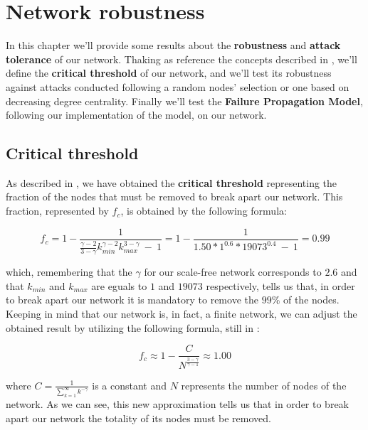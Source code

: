 \chapter{Network robustness} %
\label{cha:network_robustness}
    In this chapter we'll provide some results about the \textbf{robustness} and \textbf{attack tolerance} of our
    network. Thaking as reference the concepts described in \cite{network_science}, we'll define the
    \textbf{critical threshold} of our network, and we'll test its robustness against attacks conducted following
    a random nodes' selection or one based on decreasing degree centrality. Finally we'll test the
    \textbf{Failure Propagation Model}, following our implementation of the model, on our network.
    \section{Critical threshold} %
    \label{sec:critical_threshold}
        As described in \cite{network_science}, we have obtained the \textbf{critical threshold}
        representing the fraction of the nodes that must be removed to break apart our network. This fraction,
        represented by $f_c$, is obtained by the following formula:

        \begin{equation*}
            f_c = 1 - \frac{1}
            {\frac{\gamma - 2}{3 - \gamma}k^{\gamma - 2}_{\mathit{min}}k^{3 - \gamma}_{\mathit{max}} \ - \  1} =
            1 - \frac{1}{1.50 * 1^{0.6} * 19073^{0.4} \ - \ 1} = 0.99
        \end{equation*}

        which, remembering that the $\gamma$ for our scale-free network corresponds to $2.6$ and that
        $k_{\mathit{min}}$ and $k_{\mathit{max}}$ are eguals to $1$ and $19073$ respectively, tells us that, in
        order to break apart our network it is mandatory to remove the $99\%$ of the nodes. Keeping in mind that
        our network is, in fact, a finite network, we can adjust the obtained result by utilizing the following
        formula, still in \cite{network_science}:

        \begin{equation*}
            f_c \approx 1 - \frac{C}{N^{\frac{3 - \gamma}{\gamma - 1}}} \approx 1.00
        \end{equation*}

        where $C = \frac{1}{\sum_{k=1}^{\infty}k^{-\gamma}}$ is a constant and $N$ represents the number of nodes
        of the network. As we can see, this new approximation tells us that in order to break apart our network the
        totality of its nodes must be removed.
